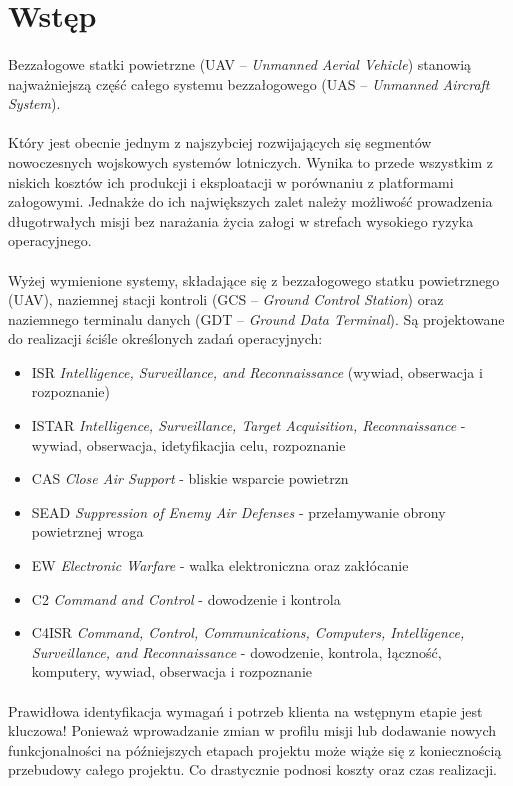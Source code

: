 \section{Wstęp}

\paragraph{}
Bezzałogowe statki powietrzne (UAV – \textit{Unmanned Aerial Vehicle}) stanowią najważniejszą część całego systemu bezzałogowego (UAS – \textit{Unmanned Aircraft System}). 

\paragraph{}
Który jest obecnie jednym z najszybciej rozwijających się segmentów nowoczesnych wojskowych systemów lotniczych. 
Wynika to przede wszystkim z niskich kosztów ich produkcji i eksploatacji w porównaniu z platformami załogowymi. 
Jednakże do ich największych zalet należy możliwość prowadzenia długotrwałych misji bez narażania życia załogi w strefach wysokiego ryzyka operacyjnego.

\paragraph{}
Wyżej wymienione systemy, składające się z bezzałogowego statku powietrznego (UAV), naziemnej stacji kontroli (GCS – \textit{Ground Control Station}) oraz naziemnego terminalu danych (GDT – \textit{Ground Data Terminal}).
Są projektowane do realizacji ściśle określonych zadań operacyjnych:
\begin{itemize}
    \item ISR \textit{Intelligence, Surveillance, and Reconnaissance} (wywiad, obserwacja i rozpoznanie)
    \item ISTAR \textit{Intelligence, Surveillance, Target Acquisition, Reconnaissance} - wywiad, obserwacja, idetyfikacjia celu, rozpoznanie
    \item CAS \textit{Close Air Support} - bliskie wsparcie powietrzn
    \item SEAD \textit{Suppression of Enemy Air Defenses} - przełamywanie obrony powietrznej wroga
    \item EW \textit{Electronic Warfare} - walka elektroniczna oraz zakłócanie
    \item C2 \textit{Command and Control} - dowodzenie i kontrola
    \item C4ISR \textit{Command, Control, Communications, Computers, Intelligence, Surveillance, and Reconnaissance} - dowodzenie, kontrola, łączność, komputery, wywiad, obserwacja i rozpoznanie
\end{itemize}

\paragraph{}
Prawidłowa identyfikacja wymagań i potrzeb klienta na wstępnym etapie jest kluczowa!
Ponieważ wprowadzanie zmian w profilu misji lub dodawanie nowych funkcjonalności
na późniejszych etapach projektu może wiąże się z koniecznością przebudowy całego projektu. 
Co drastycznie podnosi koszty oraz czas realizacji.
